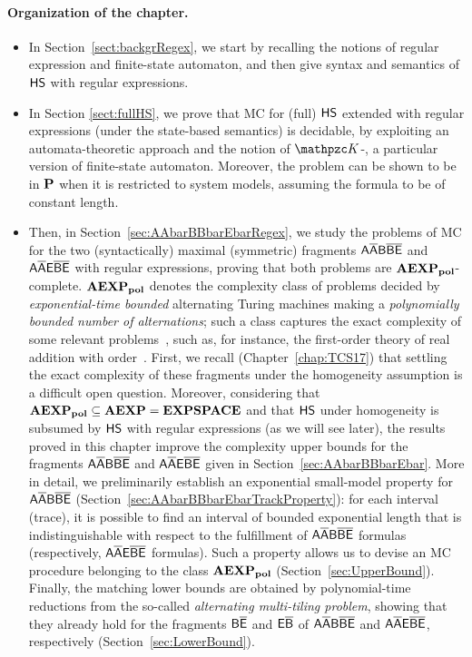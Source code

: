 \paragraph*{Organization of the chapter.}
\begin{itemize}

\item
In Section~\ref{sect:backgrRegex}, we start by recalling the notions of regular expression and finite-state automaton, and then give syntax and semantics of $\text{\sffamily HS}$ with regular expressions.

\item
In Section \ref{sect:fullHS}, we prove that MC for (full) $\text{\sffamily HS}$ extended with regular expressions (under the state-based semantics) is decidable,
by exploiting an automata-theoretic approach and the notion of $\Ku$-\NFA, a particular version of finite-state automaton. 
Moreover, the problem can be shown to be in $\textbf{P}$ when it is restricted to 
system models, assuming the formula to be of constant length. 

\item
Then, in Section~\ref{sec:AAbarBBbarEbarRegex},
we study the problems of MC for the two (syntactically) maximal (symmetric) 
fragments $\mathsf{A}\mathsf{\overline{A}}\mathsf{B}\mathsf{\overline{B}}\mathsf{\overline{E}}$ and $\mathsf{A}\mathsf{\overline{A}}\mathsf{E}\mathsf{\overline{B}}\mathsf{\overline{E}}$ with regular 
expressions, proving that both problems are $\mathbf{AEXP_{pol}}$-complete. 
$\mathbf{AEXP_{pol}}$ denotes the complexity class of problems decided by   
\emph{exponential-time bounded} alternating Turing machines making a 
\emph{polynomially 
bounded number of alternations}; such a class captures the exact complexity of 
some relevant problems~\cite{tcs15l,FR75}, such as, for instance, the 
first-order 
theory of real addition with order~\cite{FR75}.
First, we recall (Chapter~\ref{chap:TCS17}) that settling the exact complexity 
of these fragments under the homogeneity assumption is a difficult open 
question. Moreover,  considering that $\mathbf{AEXP_{pol}} \subseteq \textbf{AEXP} = \textbf{EXPSPACE}$ and 
that $\text{\sffamily HS}$ under homogeneity  is subsumed by $\text{\sffamily HS}$ with regular expressions (as 
we will see later), 
the results proved in this chapter improve  the complexity upper bounds for the 
fragments  
$\mathsf{A}\mathsf{\overline{A}}\mathsf{B}\mathsf{\overline{B}}\mathsf{\overline{E}}$ and $\mathsf{A}\mathsf{\overline{A}}\mathsf{E}\mathsf{\overline{B}}\mathsf{\overline{E}}$ given in 
Section~\ref{sec:AAbarBBbarEbar}. 
%
More in detail, we preliminarily establish an exponential small-model property 
for $\mathsf{A}\mathsf{\overline{A}}\mathsf{B}\mathsf{\overline{B}}\mathsf{\overline{E}}$ (Section~\ref{sec:AAbarBBbarEbarTrackProperty}): for 
each interval (trace),  it is possible to find an interval of bounded 
exponential 
length that is indistinguishable with respect to the fulfillment of 
$\mathsf{A}\mathsf{\overline{A}}\mathsf{B}\mathsf{\overline{B}}\mathsf{\overline{E}}$ formulas (respectively, $\mathsf{A}\mathsf{\overline{A}}\mathsf{E}\mathsf{\overline{B}}\mathsf{\overline{E}}$ formulas).
Such a property allows us to devise an MC procedure belonging to the class $\mathbf{AEXP_{pol}}$ (Section~\ref{sec:UpperBound}). 
Finally, the %
matching lower bounds are obtained %
by polynomial-time reductions from the so-called \emph{alternating multi-tiling 
problem}, showing that they already hold for the fragments $\mathsf{B}\mathsf{\overline{E}}$ and 
$\mathsf{E}\mathsf{\overline{B}}$ of $\mathsf{A}\mathsf{\overline{A}}\mathsf{B}\mathsf{\overline{B}}\mathsf{\overline{E}}$ and $\mathsf{A}\mathsf{\overline{A}}\mathsf{E}\mathsf{\overline{B}}\mathsf{\overline{E}}$, respectively 
(Section~\ref{sec:LowerBound}). 


\end{itemize}
